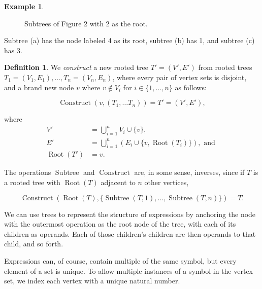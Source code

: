 \documentclass{article}
\theoremstyle{definition}
\newtheorem{defin}[thm]{Definition}
\newtheorem{exa}[thm]{Example}
\DeclareMathOperator{\construct}{Construct}
\DeclareMathOperator{\Root}{Root}
\DeclareMathOperator{\subtree}{Subtree}
\begin{document}
\begin{exa}
\begin{figure}[H]
{} 
    \caption{Subtrees of Figure 2 with 2 as the root.}
\end{figure}

Subtree (a) has the node labeled 4 as its root, subtree (b) has 1, and subtree (c) has 3.

\end{exa}

\begin{defin}
    We \emph{construct} a new rooted tree $T' = (V', E')$ from rooted trees $T_1 = (V_1, E_1), \ldots ,T_n = (V_n, E_n)$, where every pair of vertex sets is disjoint, and a brand new node $v$ where $v \notin V_i$ for $i \in \{1, \ldots, n\}$ as follows:
    
    \begin{equation*}
        \construct(v, (T_1, \ldots T_n)) = T' = (V', E'),
    \end{equation*}
    
    where
    \begin{align*}
        V' &= \bigcup\limits_{i=1}^{n}V_i \cup\{v\},\\
        E' &= \bigcup\limits_{i=1}^{n}(E_i \cup \{v, \Root(T_i)\}), \text{ and }\\
        \Root(T') &= v.
    \end{align*}
\end{defin}

The operations $\subtree$ and $\construct$ are, in some sense, inverses, since if $T$ is a rooted tree with $\Root(T)$ adjacent to $n$ other vertices, 

\begin{equation*}
    \construct(\Root(T), \{\subtree(T,1), \ldots, \subtree(T, n)\}) = T.
\end{equation*}

We can use trees to represent the structure of expressions by anchoring the node with the outermost operation as the root node of the tree, with each of its children as operands. Each of those children's children are then operands to that child, and so forth.

Expressions can, of course, contain multiple of the same symbol, but every element of a set is unique. To allow multiple instances of a symbol in the vertex set, we index each vertex with a unique natural number.
\end{document}
